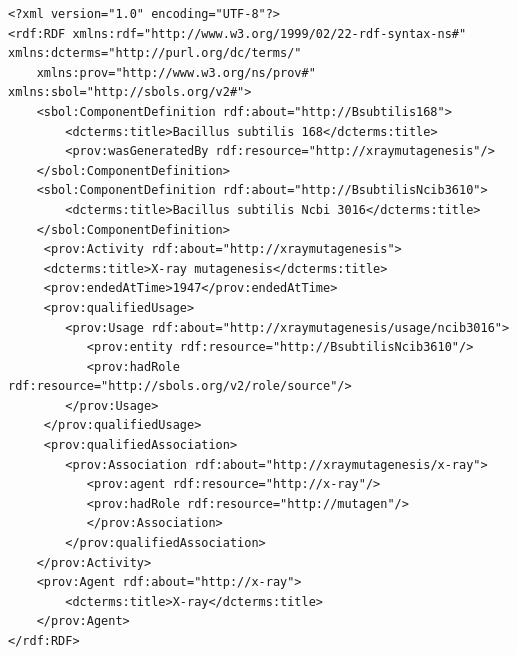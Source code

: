 \begin{lstlisting}
<?xml version="1.0" encoding="UTF-8"?>
<rdf:RDF xmlns:rdf="http://www.w3.org/1999/02/22-rdf-syntax-ns#" xmlns:dcterms="http://purl.org/dc/terms/"
    xmlns:prov="http://www.w3.org/ns/prov#" xmlns:sbol="http://sbols.org/v2#">
    <sbol:ComponentDefinition rdf:about="http://Bsubtilis168">
        <dcterms:title>Bacillus subtilis 168</dcterms:title>
        <prov:wasGeneratedBy rdf:resource="http://xraymutagenesis"/>                  
    </sbol:ComponentDefinition>
    <sbol:ComponentDefinition rdf:about="http://BsubtilisNcib3610">
        <dcterms:title>Bacillus subtilis Ncbi 3016</dcterms:title>
    </sbol:ComponentDefinition>
     <prov:Activity rdf:about="http://xraymutagenesis">
     <dcterms:title>X-ray mutagenesis</dcterms:title>
     <prov:endedAtTime>1947</prov:endedAtTime>
     <prov:qualifiedUsage>
        <prov:Usage rdf:about="http://xraymutagenesis/usage/ncib3016">
           <prov:entity rdf:resource="http://BsubtilisNcib3610"/>
           <prov:hadRole rdf:resource="http://sbols.org/v2/role/source"/>
        </prov:Usage>
     </prov:qualifiedUsage>
     <prov:qualifiedAssociation>
        <prov:Association rdf:about="http://xraymutagenesis/x-ray">
           <prov:agent rdf:resource="http://x-ray"/>
           <prov:hadRole rdf:resource="http://mutagen"/>
           </prov:Association>
        </prov:qualifiedAssociation>    
    </prov:Activity>
    <prov:Agent rdf:about="http://x-ray">
        <dcterms:title>X-ray</dcterms:title>
    </prov:Agent>
</rdf:RDF>
\end{lstlisting}




